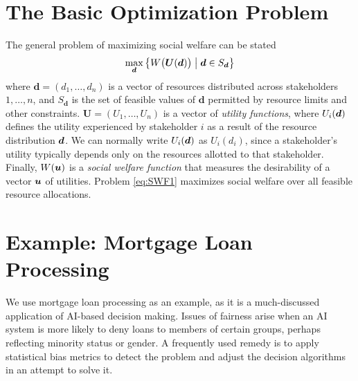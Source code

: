 \documentclass{article}[11pt]
\begin{document}
\section{The Basic Optimization Problem} \label{sec:optprob}
The general problem of maximizing social welfare can be stated
\begin{equation}
    \max_{\bm{d}} \big\{ W\big(\bm{U}(\bm{d})\big)\;\big|\; \bm{d}\in S_{\bm{d}} \big\}
    \label{eq:SWF1}
\end{equation}
where $\bm{d}=(d_1,\ldots,d_n)$ is a vector of resources distributed across stakeholders $1,\ldots, n$, and $S_{\bm{d}}$ is the set of feasible values of $\bm{d}$ permitted by resource limits and other constraints.  $\bm{U}=(U_1,\ldots,U_n)$ is a vector of {\em utility functions}, where $U_i(\bm{d})$ defines the utility experienced by stakeholder $i$ as a result of the resource distribution $\bm{d}$.  We can normally write $U_i(\bm{d})$ as $U_i(d_i)$, since a stakeholder's utility typically depends only on the resources allotted to that stakeholder.  Finally, $W(\bm{u})$ is a {\em social welfare function} that measures the desirability of a vector $\bm{u}$ of utilities.  Problem \eqref{eq:SWF1} maximizes social welfare over all feasible resource allocations.  


 




\section{Example: Mortgage Loan Processing}  \label{sec:ex-loan}
We use mortgage loan processing as an example, as it is a much-discussed application of AI-based decision making.  Issues of fairness arise when an AI system is more likely to deny loans to members of certain groups, perhaps reflecting minority status or gender.  A frequently used remedy is to apply statistical bias metrics to detect the problem and adjust the decision algorithms in an attempt to solve it.  
\end{document}
